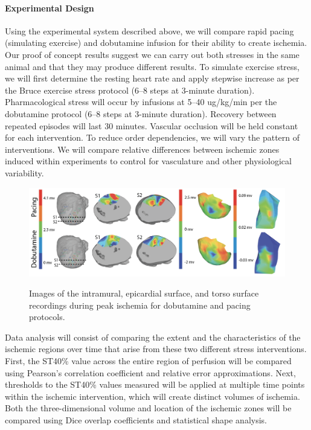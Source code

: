 \paragraph{Experimental Design} Using the experimental system described
above, we will compare rapid pacing (simulating exercise) and dobutamine infusion for their
ability to create ischemia. Our proof of concept results suggest we can
carry out both stresses in the same animal and that they may produce
different results.  To simulate exercise stress, we will first determine
the resting heart rate and apply stepwise increase as per the Bruce
exercise stress protocol (6--8 steps at 3-minute
duration).\cite{BLZ:Oki1986} Pharmacological stress will occur by infusions
at 5--40 ug/kg/min per the dobutamine protocol (6--8 steps at 3-minute
duration).\cite{BLZ:SAL1992} Recovery between repeated episodes will last
30 minutes. Vascular occlusion will be held constant for each
intervention. To reduce order dependencies, we will vary the pattern of
interventions. We will compare relative differences between ischemic zones induced within experiments to control for vasculature and other physiological variability.


\begin{figure}[htb]%
    \vspace{-.3in}
    \begin{center}
        {\includegraphics[width=\textwidth]
          {../Figures/fig2.png}}
        \captionsetup{width = \textwidth}
        \caption{\small \label{fig:dobutvspacing} Images of the
          intramural, epicardial surface, and torso surface recordings
          during peak ischemia for dobutamine and pacing protocols.}
    \end{center}
    \vspace{-.25in}
\end{figure}


Data analysis will consist of comparing the extent and the characteristics
of the ischemic regions over time that arise from these two different
stress interventions. First, the ST40\% value across the entire region of
perfusion will be compared using Pearson's correlation coefficient and
relative error approximations. Next, thresholds to the ST40\% values
measured will be applied at multiple time points within the ischemic
intervention, which will create distinct volumes of ischemia. Both the
three-dimensional volume and location of the ischemic zones will be
compared using Dice overlap coefficients and statistical shape analysis.

